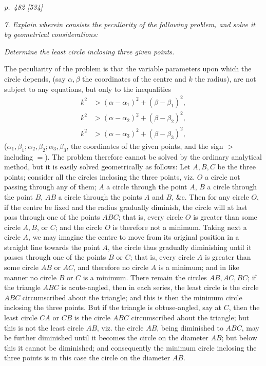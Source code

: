 \documentclass[11pt,a4paper]{article}
\theoremstyle{plain}
\theoremstyle{definition}
\newcommand{\sect}[1]{\medskip\noindent\textit{#1}}
\newcommand{\dash}{\textemdash}
\begin{document}
\bigskip
\textit{p.~482 [534]}
\smallskip

\noindent
\sect{7. Explain wherein consists the peculiarity of the following problem, and solve
it by geometrical considerations:\dash}

\sect{Determine the least circle inclosing three given points.}

The peculiarity of the problem is that the variable parameters upon which the circle
depends, (say $\alpha,\beta$ the coordinates of the centre and $k$ the radius), are
not subject to any equations, but only to the inequalities
\[
\begin{split}
k^2&>(\alpha-\alpha_1)^2+(\beta-\beta_1)^2,\\
k^2&>(\alpha-\alpha_2)^2+(\beta-\beta_2)^2,\\
k^2&>(\alpha-\alpha_3)^2+(\beta-\beta_3)^2,
\end{split}
\]
($\alpha_1,\beta_1;\alpha_2,\beta_2;\alpha_3,\beta_3$, the coordinates of the given
points, and the sign $>$ including $=$). The problem therefore cannot be solved
by the ordinary analytical method, but it is easily solved geometrically as follows:
Let $A,B,C$ be the three points; consider all the circles inclosing the three points,
viz. $O$ a circle not passing through any of them; $A$ a circle through the point
$A$, $B$ a circle through the point $B$, $AB$ a circle through the points $A$ and
$B$, \&c. Then for any circle $O$, if the centre be fixed and the radius gradually
diminish, the circle will at last pass through one of the points $ABC$; that is,
every circle $O$ is greater than some circle $A,B$, or $C$; and the circle $O$ is
therefore not a minimum. Taking next a circle $A$, we may imagine the centre to
move from its original position in a straight line towards the point $A$, the circle
thus gradually diminishing until it passes through one of the points $B$ or $C$;
that is, every circle $A$ is greater than some circle $AB$ or $AC$, and therefore no
circle $A$ is a minimum; and in like manner no circle $B$ or $C$ is a minimum.
There remain the circles $AB,AC,BC$; if the triangle $ABC$ is acute-angled, then
in each series, the least circle is the circle $ABC$ circumscribed about the triangle;
and this is then the minimum circle inclosing the three points. But if the triangle
is obtuse-angled, say at $C$, then the least circle $CA$ or $CB$ is the circle $ABC$
circumscribed about the triangle; but this is not the least circle $AB$, viz. the
circle $AB$, being diminished to $ABC$, may be further diminished until it becomes
the circle on the diameter $AB$; but below this it cannot be diminished; and
consequently the minimum circle inclosing the three points is in this case the circle
on the diameter $AB$.
\end{document}
